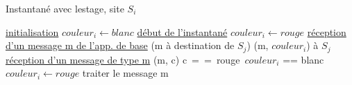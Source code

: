 \documentclass[a4paper,11pt]{article}
\begin{document}
\begin{algorithm}
\DontPrintSemicolon
\SetAlgoVlined
\LinesNumbered

\caption{Instantané avec lestage, site $S_{i}$}

\underline{initialisation} \;
  \Indp
  $couleur_{i} \gets blanc$ \;
  \Indm
\underline{début de l'instantané} \;
  \Indp
  $couleur_{i} \gets rouge$   
  \Indm
\underline{réception d'un message m de l'app. de base} \;
  \Indp
  \recevoir(m à destination de $S_{j}$) \;
  \envoyer(m, $couleur_{i}$) à $S_{j}$ \;
  \Indm
\underline{réception d'un message de type m} \;
  \Indp
  \recevoir(m, c) \;
  \si c == rouge \et $couleur_{i}$ == blanc \alors \;
    \Indp
    $couleur_{i} \gets rouge$ \;
    \Indm
  \finsi \;
  traiter le message m \;
  \Indm
\end{algorithm}

\end{document}
